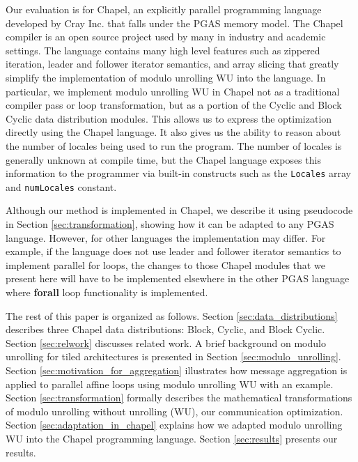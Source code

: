 Our evaluation is for Chapel, an explicitly parallel programming language developed by Cray Inc. that falls under the PGAS memory model. The Chapel compiler is an open source project used by many in industry and academic settings. The language contains many high level features such as zippered iteration, leader and follower iterator semantics, and array slicing that greatly simplify the implementation of modulo unrolling WU into the language. In particular, we implement modulo unrolling WU in Chapel not as a traditional compiler pass or loop transformation, but as a portion of the Cyclic and Block Cyclic data distribution modules. This allows us to express the optimization directly using the Chapel language. It also gives us the ability to reason about the number of locales being used to run the program. The number of locales is generally unknown at compile time, but the Chapel language exposes this information to the programmer via built-in constructs such as the \texttt{Locales} array and \texttt{numLocales} constant. 

Although our method is implemented in Chapel, we describe it using pseudocode in Section \ref{sec:transformation}, showing how it can be adapted to any PGAS language. However, for other languages the implementation may differ. For example, if the language does not use leader and follower iterator semantics to implement parallel for loops, the changes to those Chapel modules that we present here will have to be implemented elsewhere in the other PGAS language where \textbf{forall} loop functionality is implemented.

The rest of this paper is organized as follows. Section \ref{sec:data_distributions} describes three Chapel data distributions: Block, Cyclic, and Block Cyclic. Section \ref{sec:relwork} discusses related work. A brief background on modulo unrolling for tiled architectures \cite{barua1999maps} is presented in Section \ref{sec:modulo_unrolling}. Section \ref{sec:motivation_for_aggregation} illustrates how message aggregation is applied to parallel affine loops using modulo unrolling WU with an example. Section \ref{sec:transformation} formally describes the mathematical transformations of modulo unrolling without unrolling (WU), our communication optimization. Section \ref{sec:adaptation_in_chapel} explains how we adapted modulo unrolling WU into the Chapel programming language. Section \ref{sec:results} presents our results.